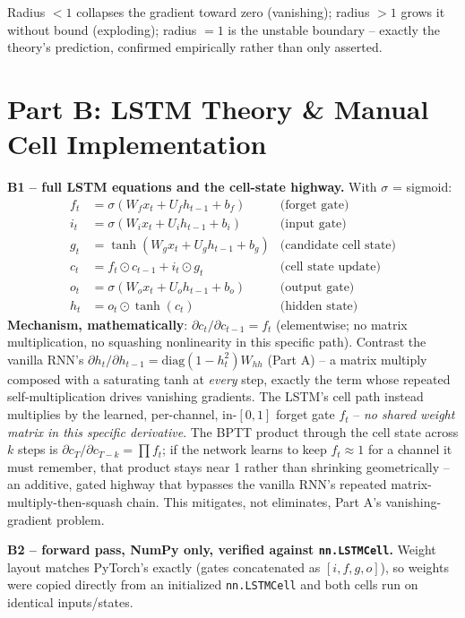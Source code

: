 \documentclass[11pt,a4paper]{article}
\begin{document}
Radius $<1$ collapses the gradient toward zero (vanishing); radius $>1$ grows it without
bound (exploding); radius $=1$ is the unstable boundary -- exactly the theory's prediction,
confirmed empirically rather than only asserted.

\section*{Part B: LSTM Theory \& Manual Cell Implementation}

\textbf{B1 -- full LSTM equations and the cell-state highway.} With $\sigma$ = sigmoid:
\begin{align*}
f_t &= \sigma(W_f x_t + U_f h_{t-1} + b_f) & \text{(forget gate)} \\
i_t &= \sigma(W_i x_t + U_i h_{t-1} + b_i) & \text{(input gate)} \\
g_t &= \tanh(W_g x_t + U_g h_{t-1} + b_g) & \text{(candidate cell state)} \\
c_t &= f_t \odot c_{t-1} + i_t \odot g_t & \text{(cell state update)} \\
o_t &= \sigma(W_o x_t + U_o h_{t-1} + b_o) & \text{(output gate)} \\
h_t &= o_t \odot \tanh(c_t) & \text{(hidden state)}
\end{align*}
\textbf{Mechanism, mathematically}: $\partial c_t/\partial c_{t-1} = f_t$ (elementwise; no
matrix multiplication, no squashing nonlinearity in this specific path). Contrast the vanilla
RNN's $\partial h_t/\partial h_{t-1} = \mathrm{diag}(1-h_t^2)W_{hh}$ (Part A) -- a matrix
multiply composed with a saturating tanh at \emph{every} step, exactly the term whose
repeated self-multiplication drives vanishing gradients. The LSTM's cell path instead
multiplies by the learned, per-channel, in-$[0,1]$ forget gate $f_t$ -- \emph{no shared
weight matrix in this specific derivative}. The BPTT product through the cell state across
$k$ steps is $\partial c_T/\partial c_{T-k} = \prod f_t$; if the network learns to keep
$f_t \approx 1$ for a channel it must remember, that product stays near 1 rather than
shrinking geometrically -- an additive, gated highway that bypasses the vanilla RNN's
repeated matrix-multiply-then-squash chain. This mitigates, not eliminates, Part A's
vanishing-gradient problem.

\textbf{B2 -- forward pass, NumPy only, verified against \texttt{nn.LSTMCell}.} Weight
layout matches PyTorch's exactly (gates concatenated as $[i,f,g,o]$), so weights were copied
directly from an initialized \texttt{nn.LSTMCell} and both cells run on identical
inputs/states.
\end{document}
